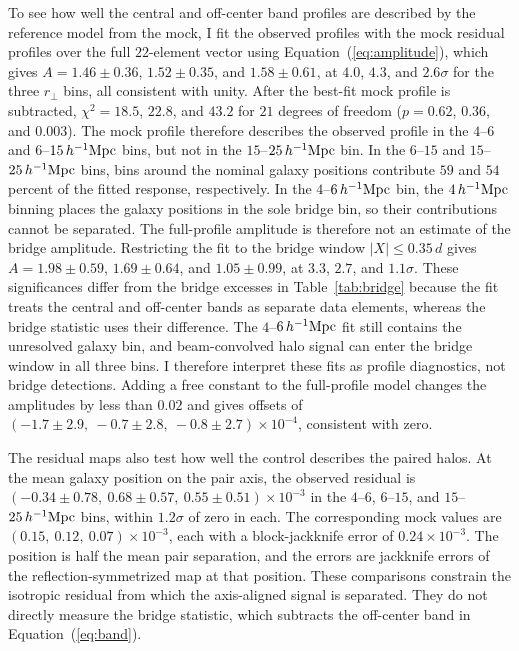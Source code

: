 \documentclass[11pt,letterpaper]{article}
\newcommand{\hinvMpc}{h^{-1}{\rm Mpc}}
\begin{document}
To see how well the central and off-center band profiles are described by the reference model from the mock, I fit the observed profiles with the mock residual profiles over the full $22$-element vector using Equation~(\ref{eq:amplitude}), which gives $A=1.46\pm0.36$, $1.52\pm0.35$, and $1.58\pm0.61$, at $4.0$, $4.3$, and
$2.6\sigma$ for the three $r_\perp$ bins, all consistent with unity. After the best-fit mock profile is subtracted, $\chi^{2}=18.5$, $22.8$, and
$43.2$ for $21$ degrees of freedom ($p=0.62$, $0.36$, and $0.003$). The mock
profile therefore describes the observed profile in the $4$--$6$ and
$6$--$15\,\hinvMpc$ bins, but not in the $15$--$25\,\hinvMpc$ bin.
In the $6$--$15$ and $15$--$25\,\hinvMpc$ bins, bins around the nominal
galaxy positions contribute $59$ and $54$ percent of the fitted response,
respectively. In the $4$--$6\,\hinvMpc$ bin, the
$4\,\hinvMpc$ binning places the galaxy positions in the sole bridge bin, so
their contributions cannot be separated. The full-profile amplitude is
therefore not an estimate of the bridge amplitude. Restricting the fit to the
bridge window
$|X|\leq0.35\,d$ gives $A=1.98\pm0.59$, $1.69\pm0.64$, and $1.05\pm0.99$, at
$3.3$, $2.7$, and $1.1\sigma$. These significances differ from the bridge
excesses in Table~\ref{tab:bridge} because the fit treats the central and
off-center bands as separate data elements, whereas the bridge statistic
uses their difference. The $4$--$6\,\hinvMpc$ fit still contains the unresolved
galaxy bin, and beam-convolved halo signal can enter the bridge window in all
three bins. I therefore interpret these fits as profile diagnostics,
not bridge detections. Adding a free constant to the full-profile model changes
the amplitudes by less than $0.02$ and gives offsets of
$(-1.7\pm2.9,\allowbreak\ -0.7\pm2.8,\allowbreak\ -0.8\pm2.7)\times10^{-4}$, consistent
with zero.




The residual maps also test how well the control describes the paired halos.
At the mean galaxy position on the pair axis, the observed residual is
$(-0.34\pm0.78,\allowbreak\ 0.68\pm0.57,\allowbreak\ 0.55\pm0.51)\times10^{-3}$ in the
$4$--$6$, $6$--$15$, and $15$--$25\,\hinvMpc$ bins, within $1.2\sigma$ of
zero in each. The corresponding mock values are
$(0.15,\allowbreak\ 0.12,\allowbreak\ 0.07)\times10^{-3}$, each with a block-jackknife
error of $0.24\times10^{-3}$. The position is half the mean
pair separation, and the errors are jackknife errors of the
reflection-symmetrized map at that position.
These comparisons constrain the isotropic residual from which the
axis-aligned signal is separated. They do not directly measure the bridge
statistic, which subtracts the off-center band in Equation~(\ref{eq:band}).
\end{document}
